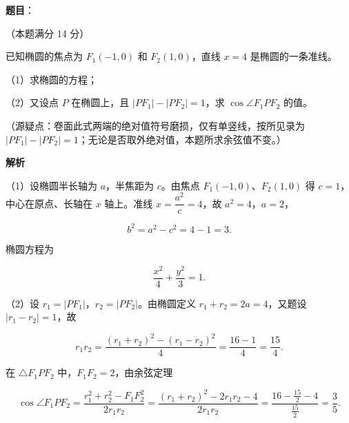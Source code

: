 \begin{answer}

\textbf{题目}：

（本题满分 14 分）

已知椭圆的焦点为 $F_1(-1,0)$ 和 $F_2(1,0)$，直线 $x=4$ 是椭圆的一条准线。

（1）求椭圆的方程；

（2）又设点 $P$ 在椭圆上，且 $|PF_1|-|PF_2|=1$，求 $\cos\angle F_1PF_2$ 的值。

（源疑点：卷面此式两端的绝对值符号磨损，仅有单竖线，按所见录为 $|PF_1|-|PF_2|=1$；无论是否取外绝对值，本题所求余弦值不变。）

\textbf{解析}

（1）设椭圆半长轴为 $a$，半焦距为 $c$。由焦点 $F_1(-1,0)$、$F_2(1,0)$ 得 $c=1$，中心在原点、长轴在 $x$ 轴上。准线 $x=\dfrac{a^2}{c}=4$，故 $a^2=4$，$a=2$，

\nopagebreak[4]
\[
b^2=a^2-c^2=4-1=3.
\]

椭圆方程为

\nopagebreak[4]
\[
\frac{x^2}{4}+\frac{y^2}{3}=1.
\]

（2）设 $r_1=|PF_1|$，$r_2=|PF_2|$。由椭圆定义 $r_1+r_2=2a=4$，又题设 $|r_1-r_2|=1$，故

\nopagebreak[4]
\[
r_1r_2=\frac{(r_1+r_2)^2-(r_1-r_2)^2}{4}=\frac{16-1}{4}=\frac{15}{4}.
\]

在 $\triangle F_1PF_2$ 中，$F_1F_2=2$，由余弦定理

\nopagebreak[4]
\[
\cos\angle F_1PF_2
=\frac{r_1^2+r_2^2-F_1F_2^2}{2r_1r_2}
=\frac{(r_1+r_2)^2-2r_1r_2-4}{2r_1r_2}
=\frac{16-\frac{15}{2}-4}{\frac{15}{2}}
=\frac35.
\]


\end{answer}
